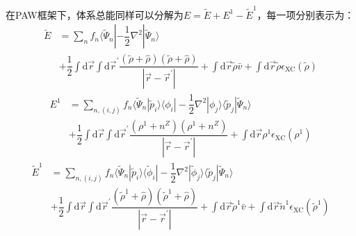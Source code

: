在\textrm{PAW}框架下，体系总能同样可以分解为$E=\tilde E+E^1-\tilde E^1$，每一项分别表示为：
\begin{equation}
	\begin{aligned}
		\tilde E&=\sum_nf_n\langle\tilde\Psi_n|-\dfrac12\nabla^2|\tilde\Psi_n\rangle\\
		&+\dfrac12\int\mathrm{d}\vec r\int\mathrm{d}\vec r^{\prime}\dfrac{(\tilde\rho+\hat\rho)(\tilde\rho+\hat\rho)}{|\vec r-\vec r^{\prime}|}+\int\mathrm{d}\vec r \tilde\rho\bar v+\int\mathrm{d}\vec r \tilde\rho\epsilon_{\mathrm{XC}}(\tilde\rho)
 	\end{aligned}
	\label{eq:PAW-Blochl-09}
\end{equation}
\begin{equation}
	\begin{aligned}
		E^1&=\sum_{n,(i,j)}f_n\langle\tilde\Psi_n|\tilde p_i\rangle\langle\phi_i|-\dfrac12\nabla^2|\phi_j\rangle\langle\tilde p_j|\tilde\Psi_n\rangle\\
		 &+\dfrac12\int\mathrm{d}\vec r\int\mathrm{d}\vec r^{\prime}\dfrac{(\rho^1+n^Z)(\rho^1+n^Z)}{|\vec r-\vec r^{\prime}|}+\int\mathrm{d}\vec r\rho^1\epsilon_{\mathrm{XC}}(\rho^1)
 	\end{aligned}
	\label{eq:PAW-Blochl-10}
\end{equation}
\begin{equation}
	\begin{aligned}
		\tilde E^1&=\sum_{n,(i,j)}f_n\langle\tilde\Psi_n|\tilde p_i\rangle\langle\tilde\phi_i|-\dfrac12\nabla^2|\tilde\phi_j\rangle\langle\tilde p_j|\tilde\Psi_n\rangle\\
		 &+\dfrac12\int\mathrm{d}\vec r\int\mathrm{d}\vec r^{\prime}\dfrac{(\tilde\rho^1+\hat\rho)(\tilde\rho^1+\hat\rho)}{|\vec r-\vec r^{\prime}|}+\int\mathrm{d}\vec r \tilde\rho^1\bar v+\int\mathrm{d}\vec r \tilde n^1\epsilon_{\mathrm{XC}}(\tilde\rho^1)
 	\end{aligned} 
	\label{eq:PAW-Blochl-11}
\end{equation}
